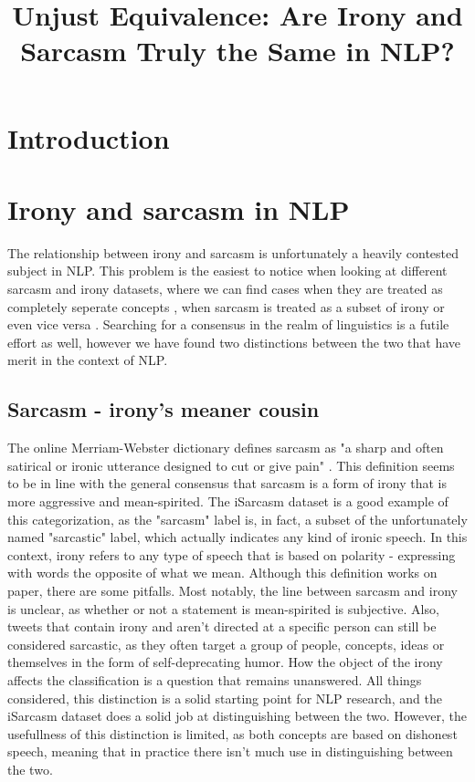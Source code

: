 \documentclass[10pt, a4paper]{article}
\title{Unjust Equivalence: Are Irony and Sarcasm Truly the Same in NLP?}
\begin{document}
\maketitleabstract

\section{Introduction}

\section{Irony and sarcasm in NLP}
The relationship between irony and sarcasm is unfortunately a heavily contested subject in NLP. This problem is the easiest
to notice when looking at different sarcasm and irony datasets, where we can find cases when they are treated as completely
seperate concepts \citep{kaggle-tweets}, when sarcasm is treated as a subset of irony \citep{semeval-2018} or even vice
versa \citep{iSarcasm}. Searching for a consensus in the realm of linguistics is a futile effort as well, however we have 
found two distinctions between the two that have merit in the context of NLP.

\subsection{Sarcasm - irony's meaner cousin}
The online Merriam-Webster dictionary defines sarcasm as "a sharp and often satirical or ironic utterance designed to 
cut or give pain" \citep{mw-dictionary}. This definition seems to be in line with the general consensus that sarcasm is
a form of irony that is more aggressive and mean-spirited. The iSarcasm dataset \citep{iSarcasm} is a good example of this 
categorization, as the "sarcasm" label is, in fact, a subset of the unfortunately named "sarcastic" label, which actually 
indicates any kind of ironic speech. 
In this context, irony refers to any type of speech that is based on polarity -
expressing with words the opposite of what we mean. Although this definition works on paper, there are some pitfalls.
Most notably, the line between sarcasm and irony is unclear, as whether or not a statement is mean-spirited is subjective.
Also, tweets that contain irony and aren't directed at a specific person can still be considered sarcastic, as they often
target a group of people, concepts, ideas or themselves in the form of self-deprecating humor. How the object of the irony
affects the classification is a question that remains unanswered.
All things considered, this distinction is a solid starting point for NLP research, and the iSarcasm \citep{iSarcasm} dataset
does a solid job at distinguishing between the two. However, the usefullness of this distinction is limited, as both concepts
are based on dishonest speech, meaning that in practice there isn't much use in distinguishing between the two.
\end{document}
